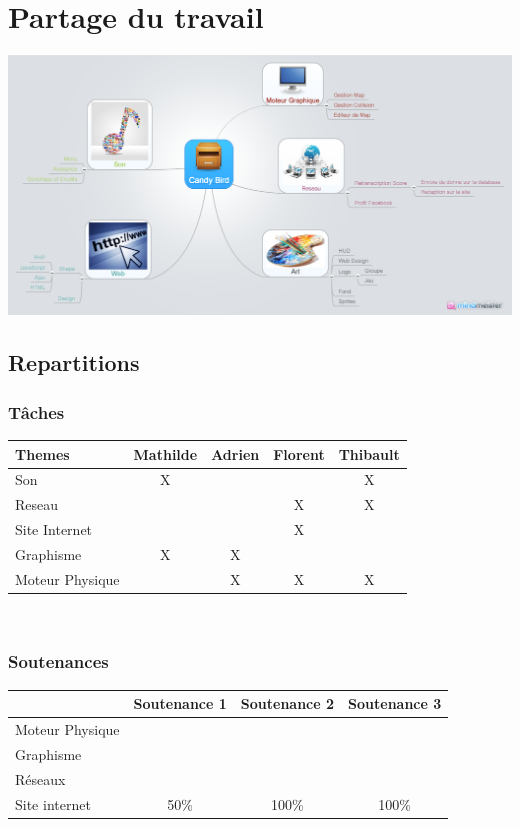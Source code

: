 \documentclass [11pt]{report}
\begin{document}
\chapter {Partage du travail}
\begin{center}
\includegraphics[scale=0.3]{images/Candy_Bird.png}
\end{center}

\newpage 

	\section{Repartitions}
		\subsection{Tâches}
			\begin{tabular}{| l |*{4} {c|}}
				\hline
				Themes & Mathilde & Adrien & Florent & Thibault \\
				\hline
				Son & X & & & X \\
				\hline
				Reseau & & & X & X \\
				\hline
				Site Internet & & & X & \\
				\hline
				Graphisme & X & X & & \\
				\hline
				Moteur Physique & & X & X & X\\
				\hline
			\end{tabular}\\\vspace{5mm}


		\subsection{Soutenances}
			\begin{tabular}{| l | * {3}{c|}}
				\hline
		 		& Soutenance 1 & Soutenance 2 & Soutenance 3 \\
				\hline
				Moteur Physique & & & \\
				\hline
				 Graphisme & & & \\
				\hline
				Réseaux & & & \\
				\hline
				Site internet & 50\% & 100\%  & 100\%  \\
	          			 \hline
			\end{tabular}\\\vspace{10mm}
\end{document}
